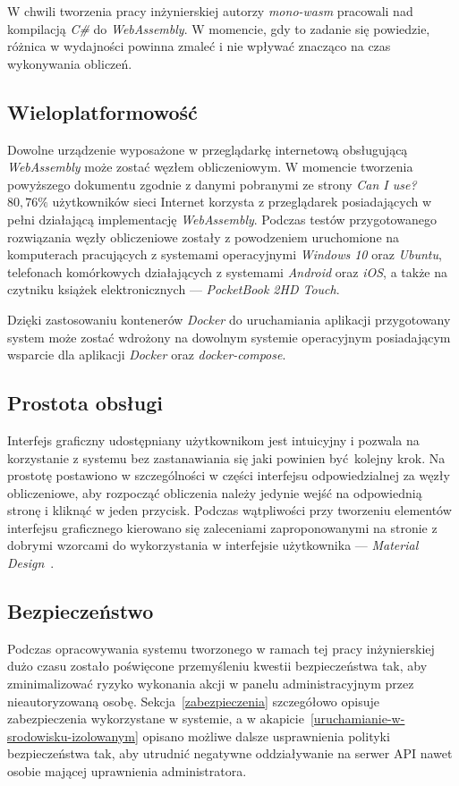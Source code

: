 \documentclass[a4paper,11pt,twoside]{report}
\theoremstyle{definition}
\begin{document}
            W chwili tworzenia pracy inżynierskiej autorzy \textit{mono-wasm} pracowali nad kompilacją \textit{C\#} do \textit{WebAssembly}. W momencie, gdy to zadanie się powiedzie, różnica w wydajności powinna zmaleć i nie wpływać znacząco na czas wykonywania obliczeń.
            
        \subsection{Wieloplatformowość}
            Dowolne urządzenie wyposażone w przeglądarkę internetową obsługującą \textit{WebAssembly} może zostać węzłem obliczeniowym.
            W momencie tworzenia powyższego dokumentu zgodnie z danymi pobranymi ze strony \textit{Can I use?}~\cite{can-i-use} $80,76\%$ użytkowników sieci Internet korzysta z przeglądarek posiadających w pełni działającą implementację \textit{WebAssembly}.
            Podczas testów przygotowanego rozwiązania węzły obliczeniowe zostały z powodzeniem uruchomione na komputerach pracujących z systemami operacyjnymi \textit{Windows 10} oraz \textit{Ubuntu}, telefonach komórkowych działających z systemami \textit{Android} oraz \textit{iOS}, a także na czytniku książek elektronicznych --- \textit{PocketBook 2HD Touch}.
            
            Dzięki zastosowaniu kontenerów \textit{Docker} do uruchamiania aplikacji przygotowany system może zostać wdrożony na dowolnym systemie operacyjnym posiadającym wsparcie dla aplikacji \textit{Docker} oraz \textit{docker-compose}.
        
        \subsection{Prostota obsługi}
            Interfejs graficzny udostępniany użytkownikom jest intuicyjny i pozwala na korzystanie z systemu bez zastanawiania się jaki powinien być kolejny krok.
            Na prostotę postawiono w szczególności w części interfejsu odpowiedzialnej za węzły obliczeniowe, aby rozpocząć obliczenia należy jedynie wejść na odpowiednią stronę i kliknąć w jeden przycisk.
            Podczas wątpliwości przy tworzeniu elementów interfejsu graficznego kierowano się zaleceniami zaproponowanymi na stronie z dobrymi wzorcami do wykorzystania w interfejsie użytkownika --- \textit{Material Design}~\cite{material-design}.
        
        \subsection{Bezpieczeństwo}
            Podczas opracowywania systemu tworzonego w ramach tej pracy inżynierskiej dużo czasu zostało poświęcone przemyśleniu kwestii bezpieczeństwa tak, aby zminimalizować ryzyko wykonania akcji w panelu administracyjnym przez nieautoryzowaną osobę.
            Sekcja~\ref{zabezpieczenia} szczegółowo opisuje zabezpieczenia wykorzystane w systemie, a w akapicie~\ref{uruchamianie-w-srodowisku-izolowanym} opisano możliwe dalsze usprawnienia polityki bezpieczeństwa tak, aby utrudnić negatywne oddziaływanie na serwer API nawet osobie mającej uprawnienia administratora.
    
\end{document}
